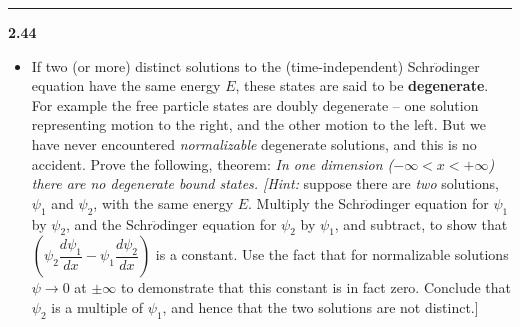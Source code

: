 \documentclass[fleqn]{article}
\begin{document}
  \rule{15cm}{1pt}

  \textbf{2.44}
  \begin{itemize}
    \item If two (or more) distinct solutions to the (time-independent) Schr$\ddot{o}$dinger equation have the
    same energy $E$, these states are said to be \textbf{degenerate}. For example the free particle states are 
    doubly degenerate -- one solution representing motion to the right, and the other motion to the left. But
    we have never encountered \emph{normalizable} degenerate solutions, and this is no accident. Prove the following,
    theorem: \emph{In one dimension ($-\infty < x < +\infty$) there are no degenerate bound states. [Hint:} suppose
    there are \emph{two} solutions, $\psi_1$ and $\psi_2$, with the same energy $E$. Multiply the Schr$\ddot{o}$dinger equation
    for $\psi_1$ by $\psi_2$, and the Schr$\ddot{o}$dinger equation for $\psi_2$ by $\psi_1$, and subtract,
    to show that $\left(\psi_2 \dfrac{d\psi_1}{dx}-\psi_1 \dfrac{d\psi_2}{dx}\right)$ is a constant. Use the 
    fact that for normalizable solutions $\psi \longrightarrow 0$ at $\pm \infty$ to demonstrate that this constant
    is in fact zero. Conclude that $\psi_2$ is a multiple of $\psi_1$, and hence that the two solutions
    are not distinct.]
  \end{itemize}
\end{document}
